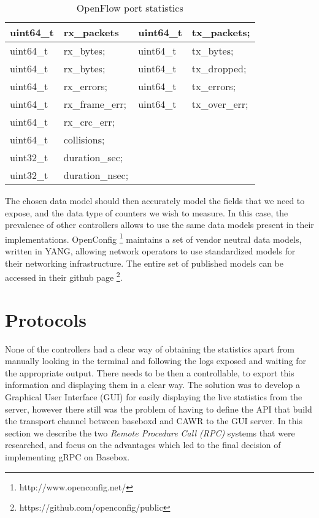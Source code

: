 \begin{table}[H]
    \centering
    \caption{OpenFlow port statistics}
    \begin{tabular}{l | l || l | l}
       uint64\_t & rx\_packets     & uint64\_t & tx\_packets;     \\ \hline
       uint64\_t & rx\_bytes;      & uint64\_t & tx\_bytes;       \\ \hline
       uint64\_t & rx\_bytes;      & uint64\_t & tx\_dropped;     \\ \hline
       uint64\_t & rx\_errors;     & uint64\_t & tx\_errors;      \\ \hline
       uint64\_t & rx\_frame\_err; & uint64\_t & tx\_over\_err;   \\ \hline
       uint64\_t & rx\_crc\_err;   &                              \\ \hline
       uint64\_t & collisions;     &                              \\ \hline
       uint32\_t & duration\_sec;  &                              \\ \hline
       uint32\_t & duration\_nsec; &                 
    \end{tabular}
\end{table}

\par The chosen data model should then accurately model the fields that we need to expose, and the data type of counters we wish to measure. In this case,
the prevalence of other controllers allows to use the same data models present in their implementations. OpenConfig \footnote{http://www.openconfig.net/} maintains
a set of vendor neutral data models, written in YANG, allowing network operators to use standardized models for their networking infrastructure.
The entire set of published models can be accessed in their github page \footnote {https://github.com/openconfig/public}.

\section {Protocols}

None of the controllers had a clear way of obtaining the statistics apart from manually looking in the terminal and following the logs exposed and waiting for the
appropriate output. There needs to be then a controllable, to export this information and displaying them in a clear way. The solution was to develop a Graphical
User Interface (GUI) for easily displaying the live statistics from the server, however there still was the problem of having to define the API that build the
transport channel between baseboxd and CAWR to the GUI server. In this section we describe the two \textit {Remote Procedure Call (RPC)} systems that were researched,
and focus on the advantages which led to the final decision of implementing gRPC on Basebox.

